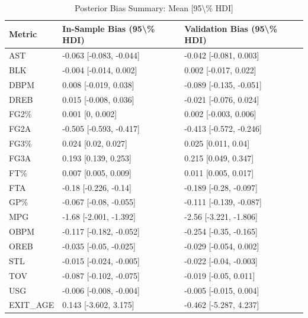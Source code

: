 \begin{table}[t]
\caption*{
{\fontsize{20}{25}\selectfont  Posterior Bias Summary: Mean [95\textbackslash{}\% HDI]\fontsize{12}{15}\selectfont }
} 
\fontsize{12.0pt}{14.0pt}\selectfont
\begin{tabular*}{\linewidth}{@{\extracolsep{\fill}}lll}
\toprule
Metric & In-Sample Bias (95\textbackslash{}\% HDI) & Validation Bias (95\textbackslash{}\% HDI) \\ 
\midrule\addlinespace[2.5pt]
AST & -0.063 [-0.083, -0.044] & -0.042 [-0.081, 0.003] \\ 
BLK & -0.004 [-0.014, 0.002] & 0.002 [-0.017, 0.022] \\ 
DBPM & 0.008 [-0.019, 0.038] & -0.089 [-0.135, -0.051] \\ 
DREB & 0.015 [-0.008, 0.036] & -0.021 [-0.076, 0.024] \\ 
FG2\% & 0.001 [0, 0.002] & 0.002 [-0.003, 0.006] \\ 
FG2A & -0.505 [-0.593, -0.417] & -0.413 [-0.572, -0.246] \\ 
FG3\% & 0.024 [0.02, 0.027] & 0.025 [0.011, 0.04] \\ 
FG3A & 0.193 [0.139, 0.253] & 0.215 [0.049, 0.347] \\ 
FT\% & 0.007 [0.005, 0.009] & 0.011 [0.005, 0.017] \\ 
FTA & -0.18 [-0.226, -0.14] & -0.189 [-0.28, -0.097] \\ 
GP\% & -0.067 [-0.08, -0.055] & -0.111 [-0.139, -0.087] \\ 
MPG & -1.68 [-2.001, -1.392] & -2.56 [-3.221, -1.806] \\ 
OBPM & -0.117 [-0.182, -0.052] & -0.254 [-0.35, -0.165] \\ 
OREB & -0.035 [-0.05, -0.025] & -0.029 [-0.054, 0.002] \\ 
STL & -0.015 [-0.024, -0.005] & -0.022 [-0.04, -0.003] \\ 
TOV & -0.087 [-0.102, -0.075] & -0.019 [-0.05, 0.011] \\ 
USG & -0.006 [-0.008, -0.004] & -0.005 [-0.015, 0.004] \\ 
EXIT\_AGE & 0.143 [-3.602, 3.175] & -0.462 [-5.287, 4.237] \\ 
\bottomrule
\end{tabular*}
\end{table}

